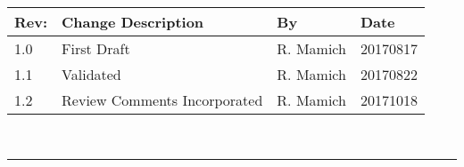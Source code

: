 \documentclass[]{BasiliskReportMemo}
\begin{document}
	
	\makeCover
	
\pagestyle{empty}
{\renewcommand{\arraystretch}{2}
	\noindent
	\begin{longtable}{|p{0.5in}|p{3.5in}|p{1.0in}|p{1.0in}|}
		\hline
		{\bfseries Rev}: & {\bfseries Change Description} & {\bfseries By}  & {\bfseries Date}\\
		\hline
		1.0 & First Draft & R. Mamich & 20170817\\
		\hline
		1.1 & Validated & R. Mamich & 20170822\\
		\hline
        1.2 & Review Comments Incorporated & R. Mamich & 20171018\\
\hline
		
	\end{longtable}
}
	
	
	
	\newpage
	\setcounter{page}{1}
	\pagestyle{fancy}
	
	\tableofcontents %
	~\\ \hrule ~\\ %
	
	
	
	
	
	
	
	
	
	
	
	
	
	
	
\end{document}
